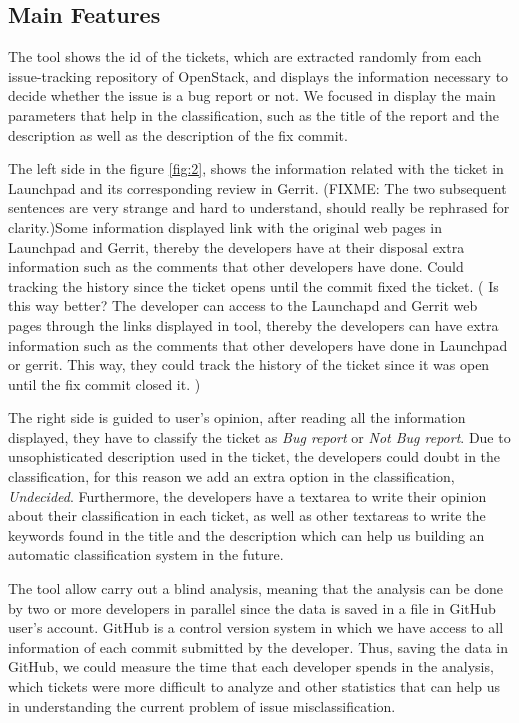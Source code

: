 \documentclass[ifip]{svmult}
\begin{document}
\subsection{Main Features}
\label{sec:2.2}
The tool shows the id of the tickets, which are extracted randomly from each issue-tracking repository of OpenStack, and displays the information necessary to decide whether the issue is a bug report or not. We focused in display the main parameters that help in the classification, such as the title of the report and the description as well as the description of the fix commit.

The left side in the figure \ref{fig:2}, shows the information related with the ticket in Launchpad and its corresponding review in Gerrit. (FIXME: The two subsequent sentences are very strange and hard to understand, should really be rephrased for clarity.)Some information displayed link with the original web pages in Launchpad and Gerrit, thereby the developers have at their disposal extra information such as the comments that other developers have done. Could tracking the history since the ticket opens until the commit fixed the ticket. ( Is this way better? The developer can access to the Launchapd and Gerrit web pages through the links displayed in tool, thereby the developers can have extra information such as the comments that other developers have done in Launchpad or gerrit. This way, they could track the history of the ticket since it was open until the fix commit closed it. )

The right side is guided to user's opinion, after reading all the information displayed, they have to classify the ticket as \textit{Bug report} or \textit{Not Bug report}. Due to unsophisticated description used in the ticket, the developers could doubt in the classification, for this reason we add an extra option in the classification, \textit{Undecided}. Furthermore, the developers have a textarea to write their opinion about their classification in each ticket, as well as other textareas to write the keywords found in the title and the description which can help us building an automatic classification system in the future.

The tool allow carry out a blind analysis, meaning that the analysis can be done by two or more developers in parallel since the data is saved in a file in GitHub user's account. GitHub is a control version system in which we have access to all information of each commit submitted by the developer. Thus, saving the data in GitHub, we could measure the time that each developer spends in the analysis, which tickets were more difficult to analyze and other statistics that can help us in understanding the current problem of issue misclassification.
\end{document}
